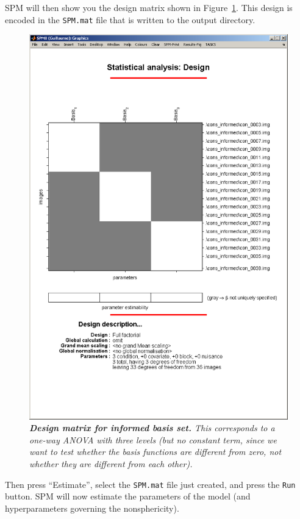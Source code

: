 SPM will then show you the design matrix shown in Figure~\ref{informed_design}. This design is encoded in the \texttt{SPM.mat} file that is written to the output directory.
\begin{figure}
\begin{center}
\includegraphics[width=140mm]{faces_group/informed_design}
\caption{\em \textbf{Design matrix for informed basis set.} This corresponds to a one-way ANOVA with three levels (but no constant term, since we want to test whether the basis functions are different from zero, not whether they are different from each other). \label{informed_design}}
\end{center}
\end{figure}
Then press ``Estimate'', select the \texttt{SPM.mat} file just created, and press the \texttt{Run} button.
SPM will now estimate the parameters of the model (and hyperparameters governing the nonsphericity).

